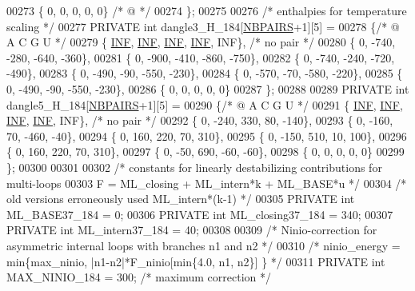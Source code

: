 \begin{DoxyCode}
00273    \{   0,    0,     0,    0,   0\}   \textcolor{comment}{/*  @ */}
00274 \};
00275 
00276 \textcolor{comment}{/* enthalpies for temperature scaling */}
00277 PRIVATE \textcolor{keywordtype}{int} dangle3\_H\_184[\hyperlink{constants_8h_a5e75221c779d618eab81e096f37e32ce}{NBPAIRS}+1][5] =
00278 \{\textcolor{comment}{/*   @     A     C     G     U   */}
00279    \{ \hyperlink{constants_8h_a12c2040f25d8e3a7b9e1c2024c618cb6}{INF},  \hyperlink{constants_8h_a12c2040f25d8e3a7b9e1c2024c618cb6}{INF},  \hyperlink{constants_8h_a12c2040f25d8e3a7b9e1c2024c618cb6}{INF},  \hyperlink{constants_8h_a12c2040f25d8e3a7b9e1c2024c618cb6}{INF},  INF\},  \textcolor{comment}{/* no pair */}
00280    \{   0, -740, -280, -640, -360\},
00281    \{   0, -900, -410, -860, -750\},
00282    \{   0, -740, -240, -720, -490\},
00283    \{   0, -490,  -90, -550, -230\},
00284    \{   0, -570,  -70, -580, -220\},
00285    \{   0, -490,  -90, -550, -230\},
00286    \{   0,    0,    0,    0,   0\}
00287 \};
00288 
00289 PRIVATE \textcolor{keywordtype}{int} dangle5\_H\_184[\hyperlink{constants_8h_a5e75221c779d618eab81e096f37e32ce}{NBPAIRS}+1][5] =
00290 \{\textcolor{comment}{/*   @     A     C     G     U   */}
00291    \{ \hyperlink{constants_8h_a12c2040f25d8e3a7b9e1c2024c618cb6}{INF},  \hyperlink{constants_8h_a12c2040f25d8e3a7b9e1c2024c618cb6}{INF},  \hyperlink{constants_8h_a12c2040f25d8e3a7b9e1c2024c618cb6}{INF},  \hyperlink{constants_8h_a12c2040f25d8e3a7b9e1c2024c618cb6}{INF},  INF\},  \textcolor{comment}{/* no pair */}
00292    \{   0, -240,  330,   80, -140\},
00293    \{   0, -160,   70, -460,  -40\},
00294    \{   0,  160,  220,   70,  310\},
00295    \{   0, -150,  510,   10,  100\},
00296    \{   0,  160,  220,   70,  310\},
00297    \{   0,  -50,  690,  -60,  -60\},
00298    \{   0,    0,    0,    0,   0\}
00299 \};
00300 
00301 
00302 \textcolor{comment}{/* constants for linearly destabilizing contributions for multi-loops}
00303 \textcolor{comment}{   F = ML\_closing + ML\_intern*k + ML\_BASE*u  */}
00304 \textcolor{comment}{/* old versions erroneously used ML\_intern*(k-1) */}
00305 PRIVATE \textcolor{keywordtype}{int} ML\_BASE37\_184 = 0;
00306 PRIVATE \textcolor{keywordtype}{int} ML\_closing37\_184 = 340;
00307 PRIVATE \textcolor{keywordtype}{int} ML\_intern37\_184 =  40;
00308 
00309 \textcolor{comment}{/* Ninio-correction for asymmetric internal loops with branches n1 and n2 */}
00310 \textcolor{comment}{/*    ninio\_energy = min\{max\_ninio, |n1-n2|*F\_ninio[min\{4.0, n1, n2\}] \} */}
00311 PRIVATE \textcolor{keywordtype}{int} MAX\_NINIO\_184 = 300;                   \textcolor{comment}{/* maximum correction */}

\end{DoxyCode}
